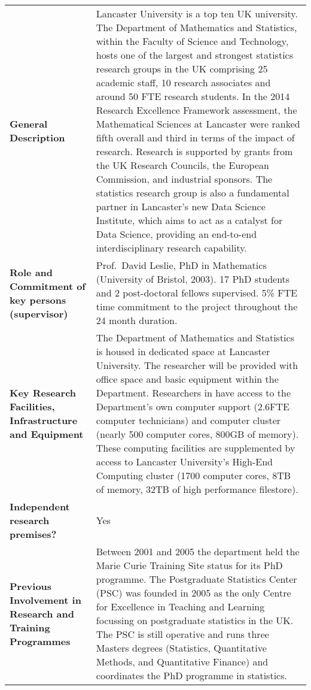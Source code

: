 \documentclass[a4paper,11pt]{article}
\begin{document}
{\fontsize{9bp}{1em}\selectfont %
\noindent\begin{tabular}{>{\raggedright}p{}p{}}
  \multicolumn{2}{l}{\textbf{Beneficiary: Lancaster University}} \\\midrule
\textbf{General Description} & Lancaster University is a top ten UK university.  The Department of Mathematics and Statistics, within the Faculty
of Science and Technology, hosts one of the largest and strongest statistics research groups in the
UK comprising 25 academic staff, 10 research associates and around 50 FTE research students. In the 2014
Research Excellence Framework assessment, the Mathematical Sciences at Lancaster were ranked fifth overall and third in
terms of the impact of research.  Research is supported by grants from the UK Research Councils, the European Commission, and industrial sponsors. The statistics research group is also a fundamental partner in Lancaster's new Data Science Institute, which aims to act as a catalyst for Data Science, providing an end-to-end interdisciplinary research capability. 

\\\midrule
\textbf{Role and Commitment of key persons (supervisor)} &
Prof.\ David Leslie, PhD in Mathematics (University of Bristol, 2003).  17 PhD students and 2 post-doctoral fellows supervised. 5\% FTE time commitment to the project throughout the 24 month duration.
\\\midrule
\textbf{Key Research Facilities, Infrastructure and Equipment} &
The Department of Mathematics and Statistics is housed in dedicated space at Lancaster University.  The researcher will be provided with office space and basic equipment within the Department. Researchers in have access to the Department's own computer support (2.6FTE computer technicians) and computer cluster (nearly 500 computer cores, 800GB of memory). These computing facilities are supplemented by access to Lancaster University's High-End Computing cluster (1700 computer cores, 8TB of memory, 32TB of high performance filestore).

\\\midrule
\textbf{Independent research premises?} & Yes

\\\midrule
\textbf{Previous Involvement in Research and Training Programmes} &
Between 2001 and 2005 the department held the Marie Curie Training Site status for its PhD programme. The Postgraduate Statistics Center (PSC) was founded in 2005 as the only Centre for Excellence in Teaching and Learning focussing on postgraduate statistics in the UK. The PSC is still operative and runs three Masters degrees (Statistics, Quantitative Methods, and Quantitative Finance) and coordinates the PhD programme in statistics.



\end{tabular}}
\end{document}
